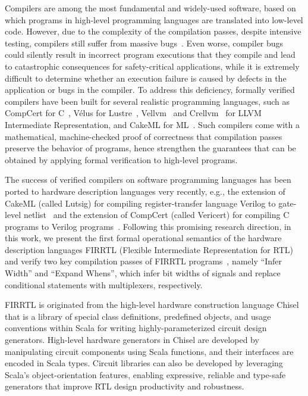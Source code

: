 
Compilers are among the most fundamental and widely-used 
software, based on which programs in high-level programming languages
are translated into low-level code.
However, due to the complexity of the compilation passes,
despite intensive testing, compilers still suffer from massive bugs~\cite{LeAS14,ZhangSS17}.
Even worse, compiler bugs could silently result in incorrect program executions that they compile and lead to catastrophic consequences  
for safety-critical applications,
while it is extremely difficult to determine whether
an execution failure is caused by defects in the application or 
bugs in the compiler. To address this deficiency, 
formally verified compilers have been built for several realistic programming languages, such as CompCert for C~\cite{Leroy09,kastner2018compcert,Leroy2006,Leroy-BKSPF-2016,BlazyDL06,Kastner-LBSSF-2017},
V\'{e}lus for Lustre~\cite{BourkeBDLPR17}, Vellvm~\cite{ZhaoNMZ12,ZhaoNMZ13} and Crellvm~\cite{KangKSLPSKCCHY18} for LLVM Intermediate Representation,
and CakeML for ML~\cite{KumarMNO14,LoowKTMNAF19,TanMKFON19,OwensNKMT17}.
Such compilers come with a mathematical, machine-checked proof of correctness
that compilation passes preserve the behavior of programs,
hence strengthen the guarantees that can be obtained by applying formal verification to high-level programs.

The success of verified compilers on software programming languages has been ported to hardware description languages 
very recently, e.g., the extension of CakeML (called Lutsig) for compiling register-transfer language Verilog to gate-level netlist~\cite{Loow21,loowphd21}
and the extension of CompCert (called Vericert) for compiling C programs to Verilog programs~\cite{HerklotzPRW21}.
Following this promising research direction, in this work, we 
present the first formal operational semantics of the hardware description languages FIRRTL (Flexible Intermediate Representation for RTL)~\cite{firrtl-spec} and verify two key compilation passes of FIRRTL programs~\cite{firrtlcompiler,IzraelevitzKLLW17}, namely ``Infer Width'' and ``Expand Whens'',
which infer bit widths of signals
and replace conditional statements with multiplexers, respectively.

FIRRTL is originated from the high-level hardware construction language Chisel~\cite{BachrachVRLWAWA12} that is
a library of special class definitions, predefined objects, and usage conventions within Scala for writing highly-parameterized circuit design generators.
High-level hardware generators in Chisel are developed by manipulating circuit components using Scala functions,
and their interfaces are encoded in Scala types.
Circuit libraries can also be developed by leveraging 
Scala's object-orientation features, enabling
expressive, reliable and type-safe generators that improve RTL design productivity and robustness.